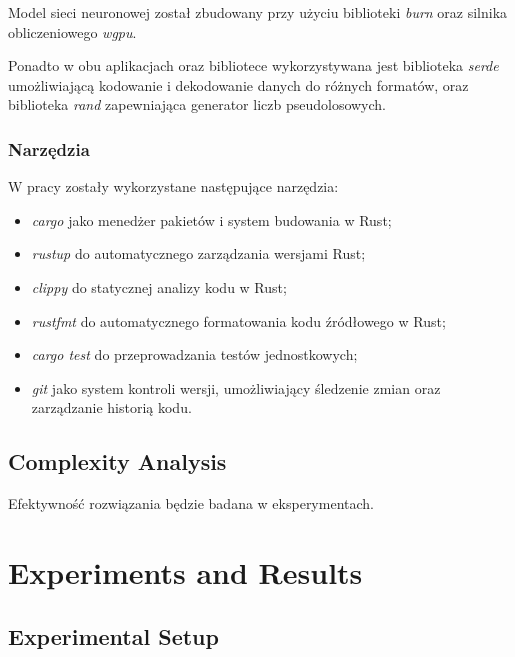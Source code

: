 \documentclass{article}
\newcommand{\temporary}[1]{
    \begin{tcolorbox}[colframe=red, colback=white, title={\textbf{WERSJA PO POLSKU}}, sharp corners=south]
        #1
    \end{tcolorbox}
}
\begin{document}
{            Model sieci neuronowej został zbudowany przy użyciu biblioteki \textit{burn}\cite{Rust:burn} oraz silnika obliczeniowego \textit{wgpu}.

            Ponadto w obu aplikacjach oraz bibliotece wykorzystywana jest biblioteka \textit{serde}\cite{Rust:serde} umożliwiającą kodowanie i dekodowanie danych do różnych formatów, oraz biblioteka \textit{rand}\cite{Rust:rand} zapewniająca generator liczb pseudolosowych.

        \subsubsection{Narzędzia}

            W pracy zostały wykorzystane następujące narzędzia:
            \begin{itemize}
                \item \textit{cargo} jako menedżer pakietów i system budowania w Rust;
                \item \textit{rustup} do automatycznego zarządzania wersjami Rust;
                \item \textit{clippy} do statycznej analizy kodu w Rust;
                \item \textit{rustfmt} do automatycznego formatowania kodu źródłowego w Rust;
                \item \textit{cargo test} do przeprowadzania testów jednostkowych;
                \item \textit{git} jako system kontroli wersji, umożliwiający śledzenie zmian oraz zarządzanie historią kodu.
            \end{itemize}
            }

        \subsection{Complexity Analysis}

            \temporary{
                Efektywność rozwiązania będzie badana w eksperymentach.
            }

    \clearpage
    \section{Experiments and Results}

        \subsection{Experimental Setup}
\end{document}
